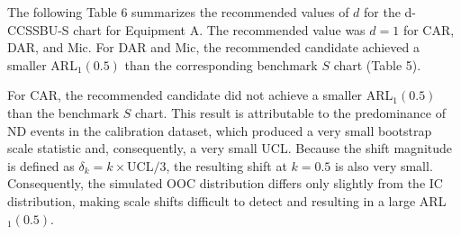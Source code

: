 \documentclass[
  12pt,
  letterpaper,
  DIV=11,
  numbers=noendperiod]{scrartcl}
\begin{document}
\begin{table}[!h]
\centering
\caption{\label{tab:display-d-selection-arl1-s-equipment-a-wide-v4}d-CCSSBU-S ARL1 simulation results for Equipment A. For each d, the d-CCSSBU-S chart was fitted using the scale-specific calibration algorithm. ARL1 was estimated by shifting the bootstrap scale statistics using delta k(d) equal to k times UCLboot(d) divided by 3.}
\centering
{}
\end{table}

\FloatBarrier

The following Table 6 summarizes the recommended values of \(d\) for the
d-CCSSBU-S chart for Equipment A. The recommended value was \(d=1\) for
CAR, DAR, and Mic. For DAR and Mic, the recommended candidate achieved a
smaller ARL\(_1(0.5)\) than the corresponding benchmark \(S\) chart
(Table 5).

For CAR, the recommended candidate did not achieve a smaller
ARL\(_1(0.5)\) than the benchmark \(S\) chart. This result is
attributable to the predominance of ND events in the calibration
dataset, which produced a very small bootstrap scale statistic and,
consequently, a very small UCL. Because the shift magnitude is defined
as \(\delta_k = k \times \mathrm{UCL}/3\), the resulting shift at
\(k=0.5\) is also very small. Consequently, the simulated OOC
distribution differs only slightly from the IC distribution, making
scale shifts difficult to detect and resulting in a large
ARL\(_1(0.5)\).
\end{document}
